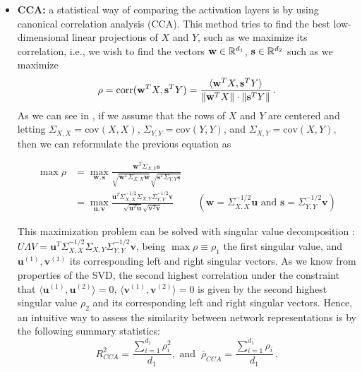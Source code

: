 \documentclass[../main.tex]{subfiles}
\begin{document}
\begin{itemize}
    \item \textbf{CCA:} a statistical way of comparing the activation layers is by using canonical correlation analysis (CCA). This method tries to find the best low-dimensional linear projections of $X$ and $Y$, such as we maximize its correlation, i.e., we wish to find the vectors $\mathbf{w} \in \mathbb{R}^{d_1}$, $\mathbf{s} \in \mathbb{R}^{d_2}$ such as we maximize
    \[
    \rho = \text{corr}(\mathbf{w}^T X, \mathbf{s}^T Y ) = \frac{\langle \mathbf{w}^T X, \mathbf{s}^T Y \rangle}{\left\lVert \mathbf{w}^T X \right\rVert \cdot \left\lVert \mathbf{s}^T Y \right\rVert}\,.
    \]
    As we can see in \cite{morcos_insights_2018}, if we assume that the rows of $X$ and $Y$ are centered and letting $\Sigma_{X, X}= \text{cov}(X,X)$, $\Sigma_{Y, Y}= \text{cov}(Y,Y)$, and $\Sigma_{X, Y}= \text{cov}(X, Y)$, then we can reformulate the previous equation as

    \begin{align*}
    \max \rho &= \max_{\mathbf{w, s}} \frac{\mathbf{w}^T \Sigma_{X,Y} \mathbf{s}}{\sqrt{\mathbf{w}^T \Sigma_{X, X} \mathbf{w}} \sqrt{\mathbf{s}^T \Sigma_{Y, Y} \mathbf{s}}}\\
    &= \max_{\mathbf{u, v}} \frac{\mathbf{u}^T \Sigma_{X,X}^{-1/2} \Sigma_{X,Y} \Sigma_{Y,Y}^{-1/2} \mathbf{v}}{\sqrt{\mathbf{u}^T \mathbf{u}} \sqrt{\mathbf{v}^T \mathbf{v}}} && \left( \mathbf{w}= \Sigma_{X,X}^{-1/2} \mathbf{u} \text{ and } \mathbf{s} =  \Sigma_{Y,Y}^{-1/2} \mathbf{v} \right) 
    \end{align*}

    This maximization problem can be solved with singular value decomposition \cite{morcos_insights_2018}: $U \Lambda V =  \mathbf{u}^T \Sigma_{X,X}^{-1/2} \Sigma_{X,Y} \Sigma_{Y,Y}^{-1/2} \mathbf{v}$, being $\max \rho \equiv \rho_1$ the first singular value, and $\mathbf{u}^{(1)}, \mathbf{v}^{(1)}$ its corresponding left and right singular vectors. As we know from properties of the SVD, the second highest correlation under the constraint that $\langle \mathbf{u}^{(1)}, \mathbf{u}^{(2)} \rangle=0$, $\langle \mathbf{v}^{(1)}, \mathbf{v}^{(2)} \rangle=0$ is given by the second highest singular value $\rho_2$ and its corresponding left and right singular vectors. Hence, an intuitive way to assess the similarity between network representations is by the following summary statistics:
    \[
        R_{CCA}^2 = \frac{\sum_{i=1}^{d_1}\rho_i^2}{d_1},\text{ and }\ 
        \bar{\rho}_{CCA} = \frac{\sum_{i=1}^{d_1}\rho_i}{d_1}\,.
    \]


\end{itemize}
\end{document}
